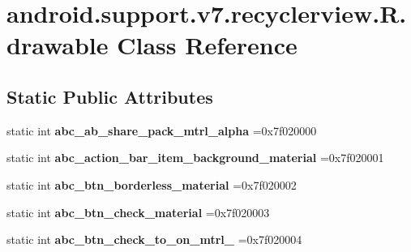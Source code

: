 \hypertarget{classandroid_1_1support_1_1v7_1_1recyclerview_1_1R_1_1drawable}{}\section{android.\+support.\+v7.\+recyclerview.\+R.\+drawable Class Reference}
\label{classandroid_1_1support_1_1v7_1_1recyclerview_1_1R_1_1drawable}
\subsection*{Static Public Attributes}
\begin{DoxyCompactItemize}
\item 
\mbox{\label{classandroid_1_1support_1_1v7_1_1recyclerview_1_1R_1_1drawable_a1459daa40c7a72cb95643c90a047a259}} 
static int {\bfseries abc\+\_\+ab\+\_\+share\+\_\+pack\+\_\+mtrl\+\_\+alpha} =0x7f020000
\item 
\mbox{\label{classandroid_1_1support_1_1v7_1_1recyclerview_1_1R_1_1drawable_a1269c623ed8ec855049a67aa6a6037a7}} 
static int {\bfseries abc\+\_\+action\+\_\+bar\+\_\+item\+\_\+background\+\_\+material} =0x7f020001
\item 
\mbox{\label{classandroid_1_1support_1_1v7_1_1recyclerview_1_1R_1_1drawable_a1baef1c09a7736a0232048af74320b82}} 
static int {\bfseries abc\+\_\+btn\+\_\+borderless\+\_\+material} =0x7f020002
\item 
\mbox{\label{classandroid_1_1support_1_1v7_1_1recyclerview_1_1R_1_1drawable_a9cadee5a25acf45c7ca3fe734d9e09c5}} 
static int {\bfseries abc\+\_\+btn\+\_\+check\+\_\+material} =0x7f020003
\item 
\mbox{\label{classandroid_1_1support_1_1v7_1_1recyclerview_1_1R_1_1drawable_a4230a7842f3c34d249f97eb1df43a7be}} 
static int {\bfseries abc\+\_\+btn\+\_\+check\+\_\+to\+\_\+on\+\_\+mtrl\+\_} =0x7f020004
\item 

\end{DoxyCompactItemize}
